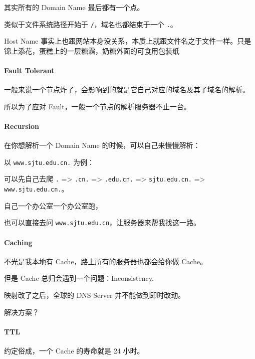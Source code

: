 \documentclass[
]{article}
\begin{document}
其实所有的 Domain Name 最后都有一个点。

类似于文件系统路径开始于 \texttt{/}，域名也都结束于一个 \texttt{.}。

Host Name
事实上也跟网站本身没关系，本质上就跟文件名之于文件一样。只是锦上添花，蛋糕上的一层糖霜，奶糖外面的可食用包装纸

\hypertarget{header-n140}{%
\paragraph{Fault Tolerant}\label{header-n140}}

一般来说一个节点炸了，会影响到的就是它自己对应的域名及其子域名的解析。

所以为了应对 Fault，一般一个节点的解析服务器不止一台。

\hypertarget{header-n143}{%
\paragraph{Recursion}\label{header-n143}}

在你想解析一个 Domain Name 的时候，可以自己来慢慢解析：

以 \texttt{www.sjtu.edu.cn.} 为例：

可以先自己去爬 \texttt{.} =\textgreater{} \texttt{.cn.} =\textgreater{}
\texttt{.edu.cn.} =\textgreater{} \texttt{sjtu.edu.cn.} =\textgreater{}
\texttt{www.sjtu.edu.cn.}。

自己一个办公室一个办公室跑，

也可以直接去问 \texttt{www.sjtu.edu.cn}，让服务器来帮我找这一路。

\hypertarget{header-n149}{%
\paragraph{Caching}\label{header-n149}}

不光是我本地有 Cache，路上所有的服务器也都会给你做 Cache。

但是 Cache 总归会遇到一个问题：Inconsistency.

映射改了之后，全球的 DNS Server 并不能做到即时改动。

解决方案？

\hypertarget{header-n154}{%
\paragraph{TTL}\label{header-n154}}

约定俗成，一个 Cache 的寿命就是 24 小时。
\end{document}
